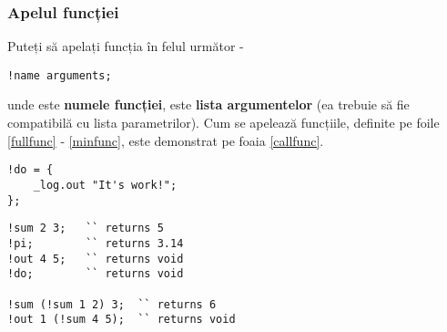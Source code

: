 \subsubsection{Apelul funcției}

Puteți să apelați funcția în felul următor -
\begin{lstlisting}[numbers=none]
!name arguments;
\end{lstlisting}
unde  este {\bf numele funcției},  este {\bf lista argumentelor} (ea trebuie să fie compatibilă cu lista parametrilor). Cum se apelează funcțiile, definite pe foile \ref{fullfunc} - \ref{minfunc}, este demonstrat pe foaia \ref{callfunc}.

\begin{lstlisting}[caption=Funcție fără argumente și tip de date, label=minfunc]
!do = {
	_log.out "It's work!";
};
\end{lstlisting}

\begin{lstlisting}[caption=Apeluri de funcții, label=callfunc]
!sum 2 3; 	`` returns 5
!pi; 		`` returns 3.14
!out 4 5; 	`` returns void
!do; 		`` returns void

!sum (!sum 1 2) 3;	`` returns 6
!out 1 (!sum 4 5);	`` returns void
\end{lstlisting}

